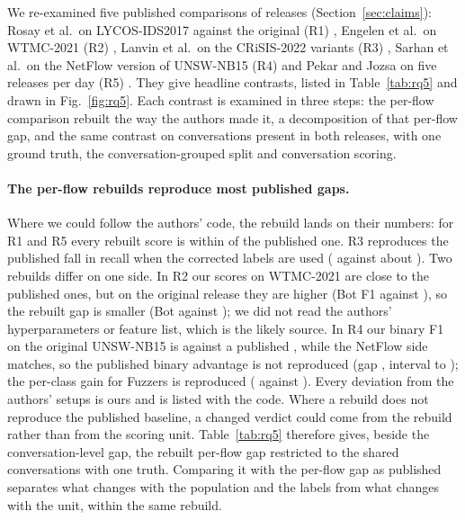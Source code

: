 We re-examined five published comparisons of releases (Section~\ref{sec:claims}): Rosay et al.\ on LYCOS-IDS2017 against the original \cicids{} (R1) \cite{rosay2021}, Engelen et al.\ on WTMC-2021 (R2) \cite{engelen2021}, Lanvin et al.\ on the CRiSIS-2022 variants (R3) \cite{lanvin2023}, Sarhan et al.\ on the NetFlow version of UNSW-NB15 (R4) \cite{sarhan2022} and Pekar and Jozsa on five releases per day (R5) \cite{pekar2024}. They give \RQfiveRows{} headline contrasts, listed in Table~\ref{tab:rq5} and drawn in Fig.~\ref{fig:rq5}. Each contrast is examined in three steps: the per-flow comparison rebuilt the way the authors made it, a decomposition of that per-flow gap, and the same contrast on conversations present in both releases, with one ground truth, the conversation-grouped split and conversation scoring.



\paragraph{The per-flow rebuilds reproduce most published gaps.} Where we could follow the authors' code, the rebuild lands on their numbers: for R1 and R5 every rebuilt score is within \RQfiveFidelityMax{} of the published one. R3 reproduces the published fall in recall when the corrected labels are used (\RQfiveQtwoFlow{} against about \RQfiveQtwoPub{}). Two rebuilds differ on one side. In R2 our scores on WTMC-2021 are close to the published ones, but on the original release they are higher (Bot F1 \RQfiveRtwoBotOrigOurs{} against \RQfiveRtwoBotOrigPub{}), so the rebuilt gap is smaller (Bot \RQfiveBotFlow{} against \RQfiveBotPub{}); we did not read the authors' hyperparameters or feature list, which is the likely source. In R4 our binary F1 on the original UNSW-NB15 is \RQfiveRfourOrigOurs{} against a published \RQfiveRfourOrigPub{}, while the NetFlow side matches, so the published binary advantage is not reproduced (gap \RQfiveBinFlow{}, interval \RQfiveBinFlowLo{} to \RQfiveBinFlowHi{}); the per-class gain for Fuzzers is reproduced (\RQfiveFuzzFlow{} against \RQfiveFuzzPub{}). Every deviation from the authors' setups is ours and is listed with the code. Where a rebuild does not reproduce the published baseline, a changed verdict could come from the rebuild rather than from the scoring unit. Table~\ref{tab:rq5} therefore gives, beside the conversation-level gap, the rebuilt per-flow gap restricted to the shared conversations with one truth. Comparing it with the per-flow gap as published separates what changes with the population and the labels from what changes with the unit, within the same rebuild.


